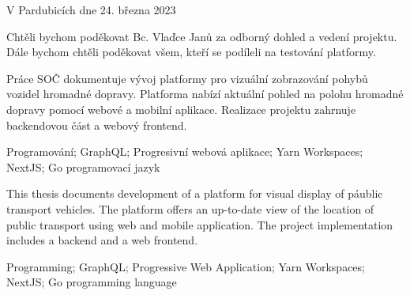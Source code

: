 \vspace{24 pt}

\noindent V Pardubicích dne 24. března 2023 \dotfill{}

\hspace{5.75cm} \authorName

\cleardoublepage

\vspace*{0.8\textheight}

\noindent
Chtěli bychom poděkovat Bc. Vlaďce Janů za odborný dohled a vedení projektu. %
Dále bychom chtěli poděkovat všem, kteří se podíleli na testování platformy.

\cleardoublepage


\noindent Práce SOČ dokumentuje vývoj platformy pro vizuální zobrazování pohybů vozidel hromadné dopravy. Platforma nabízí aktuální pohled na polohu hromadné dopravy pomocí webové a mobilní aplikace. Realizace projektu zahrnuje backendovou část a webový frontend.

\vspace{18pt}


\noindent Programování; GraphQL; Progresivní webová aplikace; Yarn Workspaces; NextJS; Go programovací jazyk
\vspace{18pt}


\noindent This thesis documents development of a platform for visual display of páublic transport vehicles. The platform offers an up-to-date view of the location of public transport using web and mobile application. The project implementation includes a backend and a web frontend.

\vspace{18pt}


\noindent Programming; GraphQL; Progressive Web Application; Yarn Workspaces; NextJS; Go programming language

\cleardoublepage